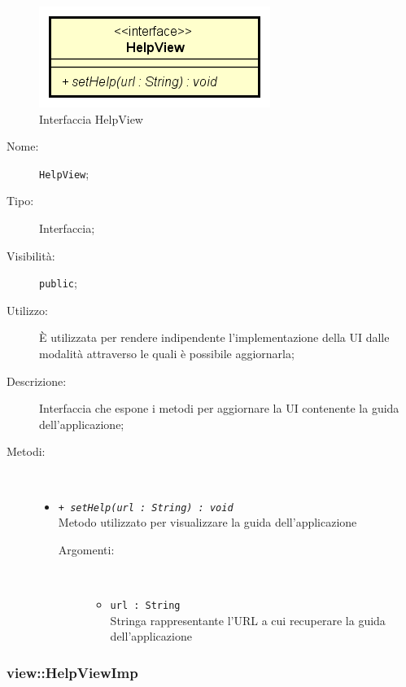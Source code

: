 \documentclass[../DefinizioneDiProdotto.tex]{subfiles}
\begin{document}
    \begin{figure}[H]
        \centering
        \includegraphics{img/HelpView.png}
        \caption{Interfaccia HelpView}\label{fig:view::HelpView} 
    \end{figure}
    \begin{description}
\item[Nome:] \texttt{HelpView};
\item[Tipo:] Interfaccia;
\item[Visibilità:] \texttt{public};
\item[Utilizzo:] È utilizzata per rendere indipendente l'implementazione della UI dalle modalità attraverso le quali è possibile aggiornarla;
\item[Descrizione:] Interfaccia che espone i metodi per aggiornare la UI contenente la guida dell'applicazione;
\item[Metodi:] \
\begin{itemize}
\item \texttt{+ \textit{setHelp(url : String) : void}}\\
Metodo utilizzato per visualizzare la guida dell'applicazione
 \begin{description}
\item[Argomenti:] \
\begin{itemize}
\item \texttt{url : String}\\
Stringa rappresentante l'URL a cui recuperare la guida dell'applicazione\end{itemize}
\end{description}
\end{itemize}
\end{description}

\subsubsection{view::HelpViewImp}
\end{document}

